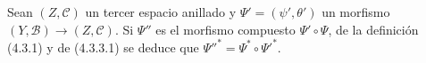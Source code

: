 \begin{env}[4.3.6]
\label{0.4.3.6-fr}
Sean $(Z,\mathcal{C})$ un tercer espacio anillado y
$\Psi'=(\psi',\theta')$ un morfismo $(Y,\mathcal{B})\to(Z,\mathcal{C})$.
Si $\Psi''$ es el morfismo compuesto $\Psi'\circ\Psi$, de la definición
(4.3.1) y de (4.3.3.1) se deduce que
${\Psi''}^*=\Psi^*\circ{\Psi'}^*$.
\end{env}
